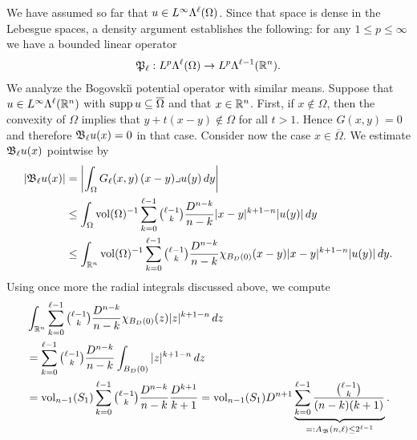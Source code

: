 \documentclass[10pt,letterpaper]{article}
\begin{document}
We have assumed so far that $u \in L^{\infty}\Lambda^{\ell}(\Omega)$. 
Since that space is dense in the Lebesgue spaces, a density argument establishes the following: 
for any $1 \leq p \leq \infty$ we have a bounded linear operator 
\begin{gather*}
    {\mathfrak P}_{\ell} : L^{p}\Lambda^{\ell}(\Omega) \rightarrow L^{p}\Lambda^{\ell-1}({\mathbb R}^n).
\end{gather*}
% 
We analyze the Bogovski\u{\i} potential operator with similar means. 
Suppose that $u \in L^{\infty}\Lambda^{\ell}({\mathbb R}^{n})$ with $\operatorname{supp} u \subseteq \overline\Omega$ and that $x \in {\mathbb R}^{n}$.
First, if $x \notin \Omega$, then the convexity of $\Omega$ implies that $y + t( x - y ) \notin \Omega$ for all $t > 1$. Hence $G(x,y) = 0$ and therefore ${\mathfrak B}_{\ell} u(x) = 0$ in that case.
Consider now the case $x \in \overline\Omega$. 
We estimate ${\mathfrak B}_{\ell} u(x)$ pointwise by 
\begin{align*}
    \left| {\mathfrak B}_{\ell} u(x) \right|
    &=
    \left| 
        \int_{\Omega} G_{\ell}(x,y) \,(x-y)\lrcorner u(y)\,dy
    \right| 
    \\&\leq 
    \int_{\Omega} \operatorname{vol}(\Omega)^{-1} \sum_{k=0}^{\ell-1}\tbinom{\ell-1}{k} \frac{ D^{n-k} }{n-k} |x-y|^{k+1-n} |u(y)| \,dy
    \\&\leq 
    \int_{{\mathbb R}^{n}} \operatorname{vol}(\Omega)^{-1} \sum_{k=0}^{\ell-1}\tbinom{\ell-1}{k} \frac{ D^{n-k} }{n-k} \chi_{B_D(0)}(x-y) |x-y|^{k+1-n} |u(y)| \,dy
    .
\end{align*}
Using once more the radial integrals discussed above, we compute 
\begin{align*}
    &
    \int_{{\mathbb R}^{n}} \sum_{k=0}^{\ell-1} \tbinom{\ell-1}{k} \frac{ D^{n-k} }{n-k} \chi_{B_D(0)}(z) |z|^{k+1-n} \,dz
    \\&
    =
    \sum_{k=0}^{\ell-1} \tbinom{\ell-1}{k} \frac{ D^{n-k} }{n-k} \int_{B_D(0)} |z|^{k+1-n} \,dz
    \\&
    =
    \operatorname{vol}_{n-1}(S_1) \sum_{k=0}^{\ell-1} \tbinom{\ell-1}{k} \frac{ D^{n-k} }{n-k} \frac{D^{k+1}}{k+1}
    =
    \operatorname{vol}_{n-1}(S_1) D^{n+1} \underbrace{ \sum_{k=0}^{\ell-1} \frac{ \tbinom{\ell-1}{k} }{ (n-k)(k+1) } }_{ =: A_{{\mathfrak B}}(n,\ell) \leq 2^{\ell-1}}
    .
\end{align*}
\end{document}
